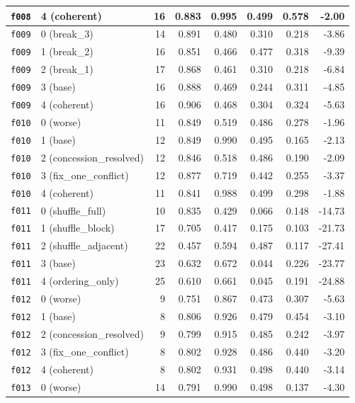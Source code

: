 \documentclass[11pt]{article}
\begin{document}
\begin{table}[htbp]
\begin{tabular}{llrrrrrr}
\texttt{f008} & 4 (coherent) & 16 & 0.883 & 0.995 & 0.499 & 0.578 & -2.00 \\
\midrule
\texttt{f009} & 0 (break\_3) & 14 & 0.891 & 0.480 & 0.310 & 0.218 & -3.86 \\
\texttt{f009} & 1 (break\_2) & 16 & 0.851 & 0.466 & 0.477 & 0.318 & -9.39 \\
\texttt{f009} & 2 (break\_1) & 17 & 0.868 & 0.461 & 0.310 & 0.218 & -6.84 \\
\texttt{f009} & 3 (base) & 16 & 0.888 & 0.469 & 0.244 & 0.311 & -4.85 \\
\texttt{f009} & 4 (coherent) & 16 & 0.906 & 0.468 & 0.304 & 0.324 & -5.63 \\
\midrule
\texttt{f010} & 0 (worse) & 11 & 0.849 & 0.519 & 0.486 & 0.278 & -1.96 \\
\texttt{f010} & 1 (base) & 12 & 0.849 & 0.990 & 0.495 & 0.165 & -2.13 \\
\texttt{f010} & 2 (concession\_resolved) & 12 & 0.846 & 0.518 & 0.486 & 0.190 & -2.09 \\
\texttt{f010} & 3 (fix\_one\_conflict) & 12 & 0.877 & 0.719 & 0.442 & 0.255 & -3.37 \\
\texttt{f010} & 4 (coherent) & 11 & 0.841 & 0.988 & 0.499 & 0.298 & -1.88 \\
\midrule
\texttt{f011} & 0 (shuffle\_full) & 10 & 0.835 & 0.429 & 0.066 & 0.148 & -14.73 \\
\texttt{f011} & 1 (shuffle\_block) & 17 & 0.705 & 0.417 & 0.175 & 0.103 & -21.73 \\
\texttt{f011} & 2 (shuffle\_adjacent) & 22 & 0.457 & 0.594 & 0.487 & 0.117 & -27.41 \\
\texttt{f011} & 3 (base) & 23 & 0.632 & 0.672 & 0.044 & 0.226 & -23.77 \\
\texttt{f011} & 4 (ordering\_only) & 25 & 0.610 & 0.661 & 0.045 & 0.191 & -24.88 \\
\midrule
\texttt{f012} & 0 (worse) & 9 & 0.751 & 0.867 & 0.473 & 0.307 & -5.63 \\
\texttt{f012} & 1 (base) & 8 & 0.806 & 0.926 & 0.479 & 0.454 & -3.10 \\
\texttt{f012} & 2 (concession\_resolved) & 9 & 0.799 & 0.915 & 0.485 & 0.242 & -3.97 \\
\texttt{f012} & 3 (fix\_one\_conflict) & 8 & 0.802 & 0.928 & 0.486 & 0.440 & -3.20 \\
\texttt{f012} & 4 (coherent) & 8 & 0.802 & 0.931 & 0.498 & 0.440 & -3.14 \\
\midrule
\texttt{f013} & 0 (worse) & 14 & 0.791 & 0.990 & 0.498 & 0.137 & -4.30 \\

\end{tabular}
\end{table}
\end{document}
